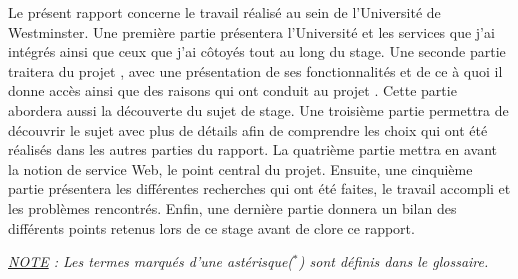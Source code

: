 Le pr\'esent rapport concerne le travail r\'ealis\'e au sein de l'Universit\'e de Westminster.
Une premi\`ere partie pr\'esentera l'Universit\'e et les services que j'ai int\'egr\'es ainsi que ceux que j'ai c\^otoy\'es tout au long du stage.
Une seconde partie traitera du projet \Yuukou{}, avec une pr\'esentation de ses fonctionnalit\'es et de ce \`a quoi il donne acc\`es  ainsi que des raisons qui ont conduit au projet \YuukouII.
Cette partie abordera aussi la d\'ecouverte du sujet de stage.
Une troisi\`eme partie permettra de d\'ecouvrir le sujet avec plus de d\'etails afin de comprendre les choix qui ont \'et\'e r\'ealis\'es dans les autres parties du rapport.
La quatri\`eme partie mettra en avant la notion de service Web, le point central du projet.
Ensuite, une cinqui\`eme partie pr\'esentera les diff\'erentes recherches qui ont \'et\'e faites, le travail accompli et les probl\`emes rencontr\'es.
Enfin, une derni\`ere partie donnera un bilan des diff\'erents points retenus lors de ce stage avant de clore ce rapport.

\vspace{1.5cm}

\begin{center}
\textit{\underline{NOTE} : Les termes marqu\'es d'une ast\'erisque($^*$) sont d\'efinis dans le glossaire.}

\end{center}

\clearpage
